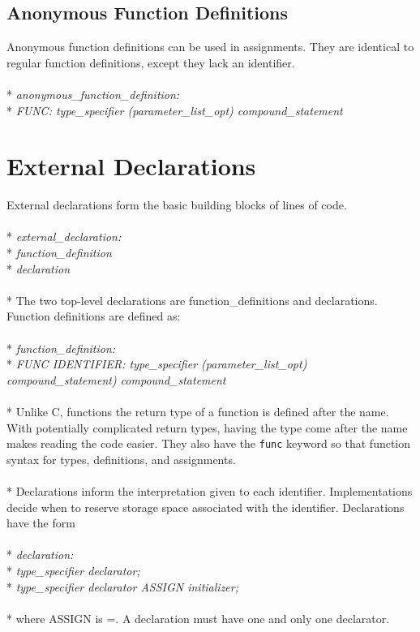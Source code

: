 \subsection{Anonymous Function Definitions}
Anonymous function definitions can be used in assignments. They are identical to regular function definitions, except they lack an identifier.
\\ \\* \tab \emph{anonymous\_function\_definition:}
\\* \tab \tab \emph{FUNC: type\_specifier (parameter\_list\_opt) compound\_statement}

\section{External Declarations}
External declarations form the basic building blocks of lines of code.
\\ \\* \tab \emph{external\_declaration:}
\\* \tab \tab \emph{function\_definition}
\\* \tab \tab \emph{declaration}
\\ \\* The two top-level declarations are function\_definitions and declarations. Function definitions are defined as:
\\ \\* \tab \emph{function\_definition:}
\\* \tab \tab \emph{FUNC IDENTIFIER: type\_specifier (parameter\_list\_opt) compound\_statement) compound\_statement}
\\ \\* Unlike C, functions the return type of a function is defined after the name. With potentially complicated return types, having the type come after the name makes reading the code easier. They also have the \verb!func! keyword so that function syntax for types, definitions, and assignments.
\\ \\* Declarations inform the interpretation given to each identifier. Implementations decide when to reserve storage space associated with the identifier. Declarations have the form
\\ \\* \tab \emph{declaration:}
\\* \tab \tab \emph{type\_specifier declarator;}
\\* \tab \tab \emph{type\_specifier declarator ASSIGN initializer;}
\\ \\* where ASSIGN is =. A declaration must have one and only one declarator.

